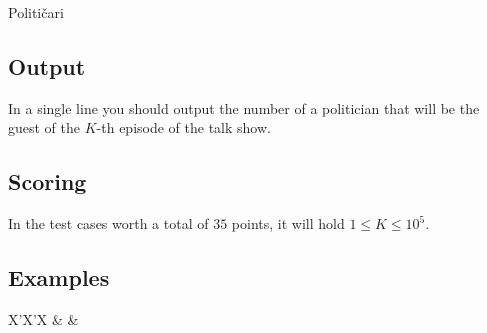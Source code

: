 \begin{statement}[
problempoints=70,
timelimit=1 second,
memorylimit=512 MiB,
]{Političari}
\subsection*{Output}
In a single line you should output the number of a politician that will be
the guest of the $K$-th episode of the talk show.

\subsection*{Scoring}
In the test cases worth a total of $35$ points, it will hold $1 \le K \le 10^5$.

\subsection*{Examples}
\begin{tabularx}{\textwidth}{X'X'X}
 &
 &
\end{tabularx}

\end{statement}

